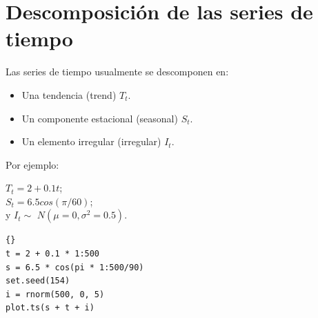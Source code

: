 \pagebreak\section{Descomposici\'on de las series de tiempo}
Las series de tiempo usualmente se descomponen en:
	\begin{itemize}
		\item Una tendencia (trend) $T_t$. 
		\item Un componente estacional (seasonal) $S_t $.
		\item Un elemento irregular (irregular) $I_t$.
	\end{itemize}
	\vspace{5mm}
Por ejemplo:
	\begin{center}
		\vspace{3mm}
		$T_t=2+0.1 t$; \\
		\vspace{3mm}
		$S_t = 6.5 cos (\pi/60)$; \\
		\vspace{3mm}
		y $I_t\sim$ $N(\mu=0, \sigma^2=0.5)$. 
	\end{center}
%
\begin{lstlisting}[title={‘Código R para descomponer serie de tiempo’},basicstyle=\ttfamily]{}
t = 2 + 0.1 * 1:500
s = 6.5 * cos(pi * 1:500/90)
set.seed(154)
i = rnorm(500, 0, 5)
plot.ts(s + t + i)
\end{lstlisting}\label{descomposicionTS}

